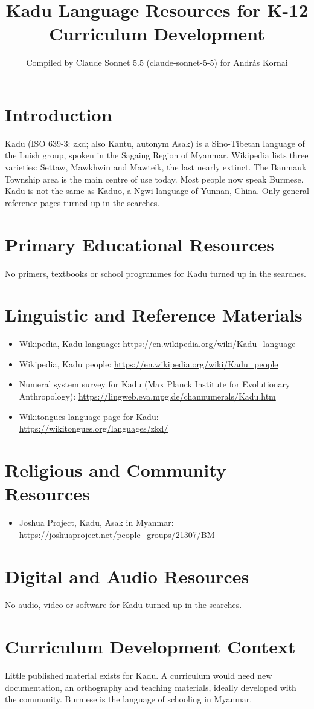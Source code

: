 \documentclass[12pt]{article}
\title{Kadu Language Resources for K-12 Curriculum Development}
\author{Compiled by Claude Sonnet 5.5 (claude-sonnet-5-5) for Andr\'as Kornai}
\date{}
\begin{document}
\maketitle

\section{Introduction}
Kadu (ISO 639-3: zkd; also Kantu, autonym Asak) is a Sino-Tibetan language of the Luish group, spoken in the Sagaing Region of Myanmar. Wikipedia lists three varieties: Settaw, Mawkhwin and Mawteik, the last nearly extinct. The Banmauk Township area is the main centre of use today. Most people now speak Burmese. Kadu is not the same as Kaduo, a Ngwi language of Yunnan, China. Only general reference pages turned up in the searches.

\section{Primary Educational Resources}
No primers, textbooks or school programmes for Kadu turned up in the searches.

\section{Linguistic and Reference Materials}
\begin{itemize}
\item Wikipedia, Kadu language: \url{https://en.wikipedia.org/wiki/Kadu_language}
\item Wikipedia, Kadu people: \url{https://en.wikipedia.org/wiki/Kadu_people}
\item Numeral system survey for Kadu (Max Planck Institute for Evolutionary Anthropology): \url{https://lingweb.eva.mpg.de/channumerals/Kadu.htm}
\item Wikitongues language page for Kadu: \url{https://wikitongues.org/languages/zkd/}
\end{itemize}

\section{Religious and Community Resources}
\begin{itemize}
\item Joshua Project, Kadu, Asak in Myanmar: \url{https://joshuaproject.net/people_groups/21307/BM}
\end{itemize}

\section{Digital and Audio Resources}
No audio, video or software for Kadu turned up in the searches.

\section{Curriculum Development Context}
Little published material exists for Kadu. A curriculum would need new documentation, an orthography and teaching materials, ideally developed with the community. Burmese is the language of schooling in Myanmar.
\end{document}
